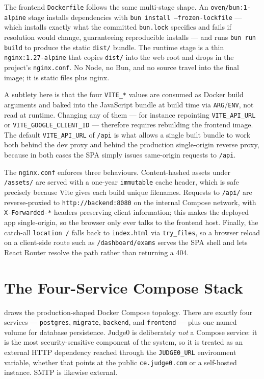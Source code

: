 The frontend \texttt{Dockerfile} follows the same multi-stage shape. An \texttt{oven/bun:1-alpine} stage installs dependencies with \texttt{bun install --frozen-lockfile} --- which installs exactly what the committed \texttt{bun.lock} specifies and fails if resolution would change, guaranteeing reproducible installs --- and runs \texttt{bun run build} to produce the static \texttt{dist/} bundle. The runtime stage is a thin \texttt{nginx:1.27-alpine} that copies \texttt{dist/} into the web root and drops in the project's \texttt{nginx.conf}. No Node, no Bun, and no source travel into the final image; it is static files plus nginx.

A subtlety here is that the four \texttt{VITE\_*} values are consumed as Docker build arguments and baked into the JavaScript bundle at build time via \texttt{ARG}/\texttt{ENV}, not read at runtime. Changing any of them --- for instance repointing \texttt{VITE\_API\_URL} or \texttt{VITE\_GOOGLE\_CLIENT\_ID} --- therefore requires rebuilding the frontend image. The default \texttt{VITE\_API\_URL} of \texttt{/api} is what allows a single built bundle to work both behind the dev proxy and behind the production single-origin reverse proxy, because in both cases the SPA simply issues same-origin requests to \texttt{/api}.

The \texttt{nginx.conf} enforces three behaviours. Content-hashed assets under \texttt{/assets/} are served with a one-year \texttt{immutable} cache header, which is safe precisely because Vite gives each build unique filenames. Requests to \texttt{/api/} are reverse-proxied to \texttt{http://backend:8080} on the internal Compose network, with \texttt{X-Forwarded-*} headers preserving client information; this makes the deployed app single-origin, so the browser only ever talks to the frontend host. Finally, the catch-all \texttt{location /} falls back to \texttt{index.html} via \texttt{try\_files}, so a browser reload on a client-side route such as \texttt{/dashboard/exams} serves the SPA shell and lets React Router resolve the path rather than returning a 404.

\section{The Four-Service Compose Stack}\label{sec:ch10-compose}

 draws the production-shaped Docker Compose topology. There are exactly four services --- \texttt{postgres}, \texttt{migrate}, \texttt{backend}, and \texttt{frontend} --- plus one named volume for database persistence. Judge0 is deliberately \emph{not} a Compose service: it is the most security-sensitive component of the system, so it is treated as an external HTTP dependency reached through the \texttt{JUDGE0\_URL} environment variable, whether that points at the public \texttt{ce.judge0.com} or a self-hosted instance. SMTP is likewise external.

